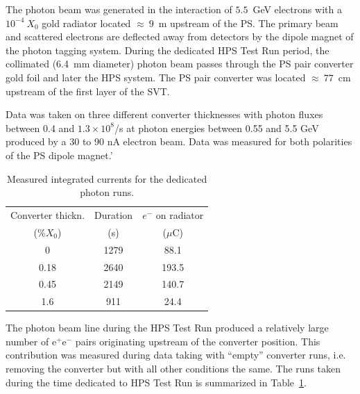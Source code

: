 \documentclass[final,3p,times,twocolumn]{elsarticle}
\newcommand{\ee}{e$^+$e$^-$}
\begin{document}
The photon beam was generated in the interaction of $5.5$~GeV electrons with a $10^{-4}~X_0$ 
gold radiator located $\approx~9$~m upstream of the PS. The primary beam and scattered 
electrons are deflected away from detectors by the dipole magnet of the photon tagging system. 
During the dedicated HPS Test Run period, the collimated (6.4~mm diameter) photon beam passes 
through the PS pair converter gold foil and later the HPS system.
The PS pair converter was located $\approx~77$~cm upstream of the first layer of the SVT.
 
 
 Data was taken on three different converter thicknesses with photon fluxes between 0.4 and 
 $1.3\times10^8$/s at photon energies between 0.55 and 5.5 GeV produced by a 30 to 90 nA electron 
 beam. Data was measured for both polarities of the PS dipole magnet.'
\begin{table}[]
\begin{center}
{\small
\begin{tabular}{|c|c|c|}
\hline
Converter thickn. & Duration &  $e^-$ on radiator \\
 (\%$X_0$) & (s) & ($\mu$C)    \\   
\hline
0    & 1279  &   88.1 \\ %
0.18   & 2640 &   193.5 \\ %
0.45  & 2149 &     140.7 \\ %
1.6   & 911 &   24.4 \\ %
\hline
\end{tabular}
}
\caption{Measured integrated currents for the dedicated photon runs.}
\label{tab:currents}
\end{center}
\end{table}
The photon beam line during the HPS Test Run produced a relatively large number of \ee{} pairs 
originating upstream of the converter position. This contribution was measured during data taking 
with ``empty'' converter runs, i.e. removing the converter but with all other conditions the same. 
The runs taken during the time dedicated to HPS Test Run is summarized in Table~\ref{tab:currents}.
\end{document}

